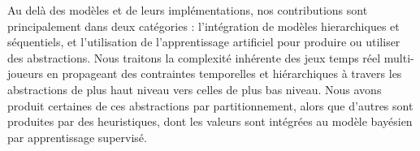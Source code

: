 Au delà des modèles et de leurs implémentations, nos contributions sont principalement dans deux catégories : l'intégration de modèles hierarchiques et séquentiels, et l'utilisation de l'apprentissage artificiel pour produire ou utiliser des abstractions. Nous traitons la complexité inhérente des jeux temps réel multi-joueurs en propageant des contraintes temporelles et hiérarchiques à travers les abstractions de plus haut niveau vers celles de plus bas niveau. Nous avons produit certaines de ces abstractions par partitionnement, alors que d'autres sont produites par des heuristiques, dont les valeurs sont intégrées au modèle bayésien par apprentissage supervisé.

